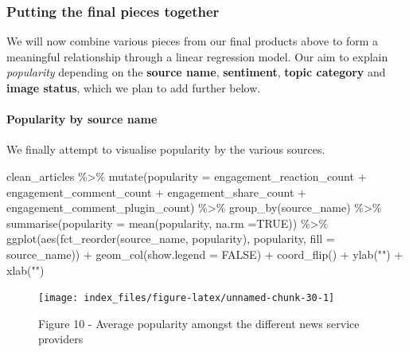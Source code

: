 \documentclass[
]{article}
\newenvironment{Shaded}{\begin{snugshade}}{\end{snugshade}}
\newcommand{\AttributeTok}[1]{\textcolor[rgb]{0.77,0.63,0.00}{#1}}
\newcommand{\ConstantTok}[1]{\textcolor[rgb]{0.00,0.00,0.00}{#1}}
\newcommand{\FunctionTok}[1]{\textcolor[rgb]{0.00,0.00,0.00}{#1}}
\newcommand{\NormalTok}[1]{#1}
\newcommand{\SpecialCharTok}[1]{\textcolor[rgb]{0.00,0.00,0.00}{#1}}
\newcommand{\StringTok}[1]{\textcolor[rgb]{0.31,0.60,0.02}{#1}}
\begin{document}
\hypertarget{putting-the-final-pieces-together}{%
\subsubsection{Putting the final pieces
together}\label{putting-the-final-pieces-together}}

We will now combine various pieces from our final products above to form
a meaningful relationship through a linear regression model. Our aim to
explain \emph{popularity} depending on the \textbf{source name},
\textbf{sentiment}, \textbf{topic category} and \textbf{image status},
which we plan to add further below.

\hypertarget{popularity-by-source-name}{%
\paragraph{Popularity by source name}\label{popularity-by-source-name}}

We finally attempt to visualise popularity by the various sources.

\begin{Shaded}
\begin{Highlighting}[]
\NormalTok{clean\_articles }\SpecialCharTok{\%\textgreater{}\%}
\FunctionTok{mutate}\NormalTok{(}\AttributeTok{popularity =}\NormalTok{ engagement\_reaction\_count }\SpecialCharTok{+}\NormalTok{ engagement\_comment\_count }\SpecialCharTok{+}\NormalTok{ engagement\_share\_count }\SpecialCharTok{+}\NormalTok{ engagement\_comment\_plugin\_count) }\SpecialCharTok{\%\textgreater{}\%}
\FunctionTok{group\_by}\NormalTok{(source\_name) }\SpecialCharTok{\%\textgreater{}\%}
\FunctionTok{summarise}\NormalTok{(}\AttributeTok{popularity =} \FunctionTok{mean}\NormalTok{(popularity, }\AttributeTok{na.rm =}\ConstantTok{TRUE}\NormalTok{)) }\SpecialCharTok{\%\textgreater{}\%}
\FunctionTok{ggplot}\NormalTok{(}\FunctionTok{aes}\NormalTok{(}\FunctionTok{fct\_reorder}\NormalTok{(source\_name, popularity), popularity, }\AttributeTok{fill =}\NormalTok{ source\_name)) }\SpecialCharTok{+}
\FunctionTok{geom\_col}\NormalTok{(}\AttributeTok{show.legend =} \ConstantTok{FALSE}\NormalTok{) }\SpecialCharTok{+}
\FunctionTok{coord\_flip}\NormalTok{() }\SpecialCharTok{+}
\FunctionTok{ylab}\NormalTok{(}\StringTok{""}\NormalTok{) }\SpecialCharTok{+}
\FunctionTok{xlab}\NormalTok{(}\StringTok{""}\NormalTok{)}
\end{Highlighting}
\end{Shaded}

\begin{figure}

{\centering \texttt{[image: index\_files/figure-latex/unnamed-chunk-30-1]} 

}

\caption{Figure 10 - Average popularity amongst the different news service providers}\label{fig:unnamed-chunk-30}
\end{figure}
\end{document}
